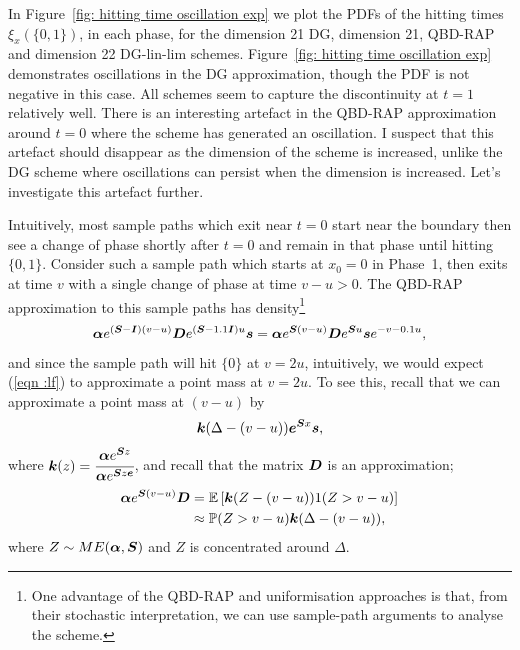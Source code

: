 In Figure~\ref{fig: hitting time oscillation exp} we plot the PDFs of the hitting times \(\xi_x(\{0,1\})\), in each phase, for the dimension 21 DG, dimension 21, QBD-RAP and dimension 22 DG-lin-lim schemes. Figure~\ref{fig: hitting time oscillation exp} demonstrates oscillations in the DG approximation, though the PDF is not negative in this case. All schemes seem to capture the discontinuity at \(t=1\) relatively well. There is an interesting artefact in the QBD-RAP approximation around \(t=0\) where the scheme has generated an oscillation. I suspect that this artefact should disappear as the dimension of the scheme is increased, unlike the DG scheme where oscillations can persist when the dimension is increased. Let's investigate this artefact further. 

Intuitively, most sample paths which exit near \(t=0\) start near the boundary then see a change of phase shortly after \(t=0\) and remain in that phase until hitting \(\{0,1\}\). Consider such a sample path which starts at \(x_0=0\) in Phase~1, then exits at time \(v\) with a single change of phase at time \(v-u>0\). The QBD-RAP approximation to this sample paths has density\footnote{One advantage of the QBD-RAP and uniformisation approaches is that, from their stochastic interpretation, we can use sample-path arguments to analyse the scheme.} 
\begin{align}
	\boldsymbol \alpha e^{(\boldsymbol S - \boldsymbol I)(v-u)} \boldsymbol D e^{(\boldsymbol S - 1.1\boldsymbol I)u}\boldsymbol s = \boldsymbol \alpha e^{\boldsymbol S(v-u)} \boldsymbol D e^{\boldsymbol Su}\boldsymbol s e^{-v-0.1u},\label{eqn :lf}
\end{align}
and since the sample path will hit \(\{0\}\) at \(v=2u\), intuitively, we would expect (\ref{eqn :lf}) to approximate a point mass at \(v=2u\). To see this, recall that we can approximate a point mass at \((v-u)\) by 
\begin{equation}\boldsymbol k(\Delta - (v-u))\boldsymbol e^{\boldsymbol Sx}\boldsymbol s,\label{eqn:aafba}\end{equation}
where \(\boldsymbol k(z)=\cfrac{\boldsymbol \alpha e^{\boldsymbol Sz}}{\boldsymbol \alpha e^{\boldsymbol Sz\boldsymbol e}}\),
and recall that the matrix \(\boldsymbol D\) is an approximation; 
\begin{align}
	\boldsymbol \alpha e^{\boldsymbol S(v-u)}\boldsymbol D &= \mathbb E\left[\boldsymbol k(Z-(v-u))1(Z>v-u)\right]\nonumber 
	\\&\approx\mathbb P(Z>v-u) \boldsymbol k(\Delta-(v-u)), \label{eqn: aegpb}
\end{align} where \(Z\sim ME(\boldsymbol \alpha,\boldsymbol S)\)
and \(Z\) is concentrated around \(\Delta\). 

